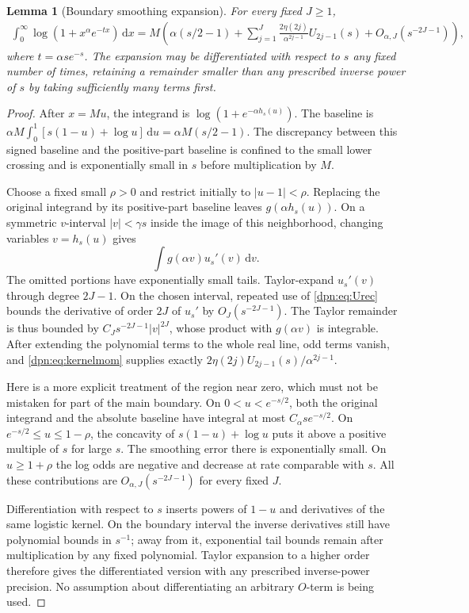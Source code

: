 \documentclass[11pt]{article}
\numberwithin{equation}{section}
\newtheorem{lemma}[theorem]{Lemma}
\theoremstyle{definition}\newtheorem{definition}[theorem]{Definition}
\theoremstyle{remark}\newtheorem{remark}[theorem]{Remark}
\newcommand{\dd}{\,\mathrm d}\newcommand{\ii}{\mathrm i}
\begin{document}
\begin{lemma}[Boundary smoothing expansion]\label{dpn:lem:smoothing}
For every fixed $J\ge1$,
\begin{align}\label{dpn:eq:smoothing}
 \int_0^\infty\log(1+x^\alpha e^{-tx})\dd x
 =M\left(\alpha(s/2-1)+
      \sum_{j=1}^J\frac{2\eta(2j)}{\alpha^{2j-1}}U_{2j-1}(s)
      +O_{\alpha,J}(s^{-2J-1})\right),
\end{align}
where $t=\alpha s e^{-s}$. The expansion may be differentiated with respect
to $s$ any fixed number of times, retaining a remainder smaller than any
prescribed inverse power of $s$ by taking sufficiently many terms first.
\end{lemma}
\begin{proof}
After $x=Mu$, the integrand is $\log(1+e^{-\alpha h_s(u)})$.
The baseline is
$\alpha M\int_0^1[s(1-u)+\log u]\dd u=\alpha M(s/2-1)$.
The discrepancy between this signed baseline and the positive-part baseline
is confined to the small lower crossing and is exponentially small in $s$
before multiplication by $M$.

Choose a fixed small $\rho>0$ and restrict initially to
$|u-1|<\rho$. Replacing the original integrand by its positive-part baseline
leaves $g(\alpha h_s(u))$. On a symmetric $v$-interval $|v|<\gamma s$
inside the image of this neighborhood, changing variables $v=h_s(u)$ gives
\[
 \int g(\alpha v)u_s'(v)\dd v.
\]
The omitted portions have exponentially small tails. Taylor-expand
$u_s'(v)$ through degree $2J-1$. On the chosen interval, repeated use of
\eqref{dpn:eq:Urec} bounds the derivative of order $2J$ of $u_s'$ by
$O_J(s^{-2J-1})$. The Taylor remainder is thus bounded by
$C_Js^{-2J-1}|v|^{2J}$, whose product with $g(\alpha v)$ is integrable.
After extending the polynomial terms to the whole real line, odd terms
vanish, and \eqref{dpn:eq:kernelmom} supplies exactly
$2\eta(2j)U_{2j-1}(s)/\alpha^{2j-1}$.

Here is a more explicit treatment of the region near zero, which must not
be mistaken for part of the main boundary. On $0<u<e^{-s/2}$, both the
original integrand and the absolute baseline have integral at most
$C_\alpha s e^{-s/2}$. On
$e^{-s/2}\le u\le1-\rho$, the concavity of
$s(1-u)+\log u$ puts it above a positive multiple of $s$ for large $s$.
The smoothing error there is exponentially small. On $u\ge1+\rho$ the
log odds are negative and decrease at rate comparable with $s$.
All these contributions are $O_{\alpha,J}(s^{-2J-1})$ for every fixed $J$.

Differentiation with respect to $s$ inserts powers of $1-u$ and derivatives
of the same logistic kernel. On the boundary interval the inverse derivatives
still have polynomial bounds in $s^{-1}$; away from it, exponential tail bounds
remain after multiplication by any fixed polynomial. Taylor expansion to a
higher order therefore gives the differentiated version with any prescribed
inverse-power precision. No assumption about differentiating an arbitrary
$O$-term is being used.
\end{proof}
\end{document}
